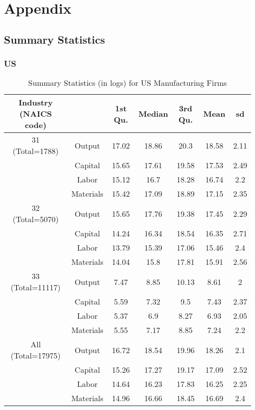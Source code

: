 \documentclass[11pt]{article}
\begin{document}



\pagebreak
\newpage

\section*{Appendix} \label{Appendix}
\subsection{Summary Statistics}

\subsubsection{US}

\begin{table}[H]
\centering
\caption{Summary Statistics (in logs) for US Manufacturing Firms}
\begin{tabular}{ccccccc}
  \hline\hline Industry (NAICS code) &   & 1st Qu. & Median & 3rd Qu. & Mean & sd \\ 
  \hline
31 (Total=1788) & Output & 17.02 & 18.86 & 20.3 & 18.58 & 2.11 \\ 
   & Capital & 15.65 & 17.61 & 19.58 & 17.53 & 2.49 \\ 
   & Labor & 15.12 & 16.7 & 18.28 & 16.74 & 2.2 \\ 
   & Materials & 15.42 & 17.09 & 18.89 & 17.15 & 2.35 \\ 
  32 (Total=5070) & Output & 15.65 & 17.76 & 19.38 & 17.45 & 2.29 \\ 
   & Capital & 14.24 & 16.34 & 18.54 & 16.35 & 2.71 \\ 
   & Labor & 13.79 & 15.39 & 17.06 & 15.46 & 2.4 \\ 
   & Materials & 14.04 & 15.8 & 17.81 & 15.91 & 2.56 \\ 
  33 (Total=11117) & Output & 7.47 & 8.85 & 10.13 & 8.61 & 2 \\ 
   & Capital & 5.59 & 7.32 & 9.5 & 7.43 & 2.37 \\ 
   & Labor & 5.37 & 6.9 & 8.27 & 6.93 & 2.05 \\ 
   & Materials & 5.55 & 7.17 & 8.85 & 7.24 & 2.2 \\ 
  All (Total=17975) & Output & 16.72 & 18.54 & 19.96 & 18.26 & 2.1 \\ 
   & Capital & 15.26 & 17.27 & 19.17 & 17.09 & 2.52 \\ 
   & Labor & 14.64 & 16.23 & 17.83 & 16.25 & 2.25 \\ 
   & Materials & 14.96 & 16.66 & 18.45 & 16.69 & 2.4 \\ 
   \hline
\end{tabular}
\label{USsum}
\end{table}
\end{document}

